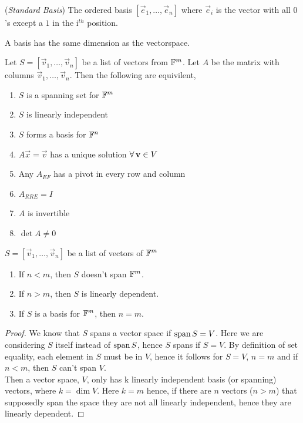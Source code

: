 \documentclass{article}
\begin{document}
\begin{ndefi}{(\textit{Standard Basis})}
  The ordered basis $[\vec e_1, \dots, \vec e_n]$ where $\vec e_i$ is the vector with all $0$'s except a $1$ in the i$^{th}$ position.
\end{ndefi}

\begin{remark}
  A basis has the same dimension as the vectorspace.
\end{remark}

\begin{nlemma}
  Let $S = [\vec v_1, \dots, \vec v_n]$ be a list of vectors from $\mathbb{F}^m$. Let $A$ be the matrix with columns $\vec v_1, \dots, \vec v_n$. Then the following are equivilent,
  \begin{enumerate}
    \item $S$ is a spanning set for $\mathbb{F}^m$
    \item $S$ is linearly independent
    \item $S$ forms a basis for $\mathbb{F}^n$
    \item $A\vec x = \vec v$ has a unique solution $\forall\, \boldsymbol{\mathbf{v}} \in V$
    \item Any $A_{EF}$ has a pivot in every row and column
    \item $A_{RRE} = I$
    \item $A$ is invertible
    \item $\det A \ne 0$
  \end{enumerate}
\end{nlemma}

\begin{nthm}
  $S = [\vec v_1, \dots, \vec v_n]$ be a list of vectors of $\mathbb{F}^m$
  \begin{enumerate}
    \item If $n < m$, then $S$ doesn't span $\mathbb{F}^m$.
    \item If $n > m$, then $S$ is linearly dependent.
    \item If $S$ is a basis for $\mathbb{F}^m$, then $n=m$.
  \end{enumerate}
\end{nthm}

\begin{proof}
  We know that $S$ spans a vector space if $\operatorname{span} S = V$. Here we are considering $S$ itself instead of $\operatorname{span} S$, hence $S$ spans if $S = V$. By definition of set equality, each element in $S$ must be in $V$, hence it follows for $S = V$, $n = m$ and if $n < m$, then $S$ can't span $V$.\\

  Then a vector space, $V$, only has k linearly independent basis (or spanning) vectors, where $k = \dim V$. Here $k = m$ hence, if there are $n$ vectors ($n > m$) that supposedly span the space they are not all linearly independent, hence they are linearly dependent.
\end{proof}
\end{document}
